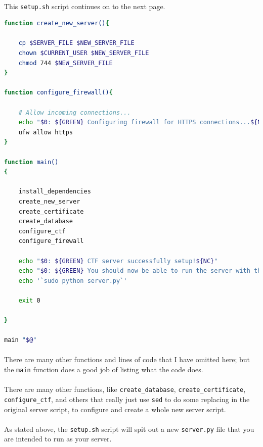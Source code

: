 \documentclass[11pt]{article}
\begin{document}
	\paragraph{} This \texttt{setup.sh} script continues on to the next page.

	\newpage

		\begin{lstlisting}[language=bash]
function create_new_server(){

	cp $SERVER_FILE $NEW_SERVER_FILE
	chown $CURRENT_USER $NEW_SERVER_FILE
	chmod 744 $NEW_SERVER_FILE
}

function configure_firewall(){
	
	# Allow incoming connections...
	echo "$0: ${GREEN} Configuring firewall for HTTPS connections...${NC}"
	ufw allow https
}

function main()
{

	install_dependencies
	create_new_server
	create_certificate
	create_database
	configure_ctf
	configure_firewall

	echo "$0: ${GREEN} CTF server successfully setup!${NC}"
	echo "$0: ${GREEN} You should now be able to run the server with the command: ${NC}"
	echo '`sudo python server.py`'

	exit 0
	
}

main "$@"
\end{lstlisting}

	\paragraph{} There are many other functions and lines of code that I have omitted here; but the \texttt{main} function does a good job of listing what the code does.

	\paragraph{} There are many other functions, like \texttt{create\_database}, \texttt{create\_certificate},  \texttt{configure\_ctf}, and others that really just use \texttt{sed} to do some replacing in the original server script, to configure and create a whole new server script.

	\paragraph{} As stated above, the \texttt{setup.sh} script will spit out a new \texttt{server.py} file that you are intended to run as your server.
\end{document}
